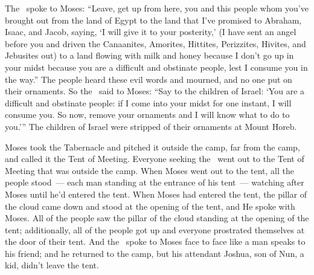 
\begin{inparaenum}
   The \lord\ spoke to Moses: ``Leave, get up from here, you and this people whom you've brought out from the land of Egypt to the land that I've promised to Abraham, Isaac, and Jacob, saying, `I will give it to your posterity,'%
   (I have sent an angel before you and driven the Canaanites, Amorites, Hittites, Perizzites, Hivites, and Jebusites out)%
   to a land flowing with milk and honey because I don't go up in your midst because you are a difficult and obstinate people, lest I consume you in the way.''%
   The people heard these evil words and mourned, and no one put on their ornaments.%
   So the \lord\ said to Moses: ``Say to the children of Israel: `You are a difficult and obstinate people: if I come into your midst for one instant, I will consume you. So now, remove your ornaments and I will know what to do to you.'\thinspace''%
   The children of Israel were stripped of their ornaments at Mount Horeb.%

   Moses took the Tabernacle and pitched it outside the camp, far from the camp, and called it the Tent of Meeting. Everyone seeking the \lord\ went out to the Tent of Meeting that was outside the camp.%
   When Moses went out to the tent, all the people stood~--- each man standing at the entrance of his tent~--- watching after Moses until he'd entered the tent.%
   When Moses had entered the tent, the pillar of the cloud came down and stood at the opening of the tent, and He spoke with Moses.%
   All of the people saw the pillar of the cloud standing at the opening of the tent; additionally, all of the people got up and everyone prostrated themselves at the door of their tent.%
   And the \lord\ spoke to Moses face to face like a man speaks to his friend; and he returned to the camp, but his attendant Joshua, son of Nun, a kid, didn't leave the tent.%


\end{inparaenum}
